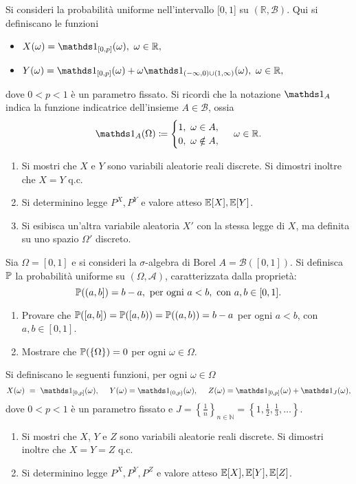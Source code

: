 Si consideri la probabilità uniforme nell'intervallo $[ 0,1$] su $(\mathbb{R} ,\mathcal{B})$. Qui si definiscano le funzioni
\begin{itemize}
\item $X( \omega ) =\Ind_{[ 0,p]}( \omega ) ,\ \omega \in \mathbb{R} ,$
\item $Y( \omega ) =\Ind_{[ 0,p]}( \omega ) +\omega \Ind_{( -\infty ,0) \cup ( 1,\infty )}( \omega ) ,\ \omega \in \mathbb{R} ,$
\end{itemize}

dove $0< p< 1$ è un parametro fissato. Si ricordi che la notazione $\Ind_{A}$ indica la funzione indicatrice dell'insieme $A\in \mathcal{B}$, ossia
\begin{equation*}
\Ind_{A}( \Omega ) \coloneqq \begin{cases}
1,\ \omega \in A,\\
0,\ \omega \notin A,
\end{cases}
\ \omega \in \mathbb{R} .
\end{equation*}
\begin{enumerate}
\item Si mostri che $X$ e $Y$ sono variabili aleatorie reali discrete. Si dimostri inoltre che $X=Y$ q.c.
\item Si determinino legge $P^{X} ,P^{Y}$ e valore atteso $\mathbb{E}[ X] ,\mathbb{E}[ Y]$.
\item Si esibisca un'altra variabile aleatoria $X' $ con la stessa legge di $X$, ma definita su uno spazio $\Omega ' $ discreto.
\end{enumerate}
\Esercizio{}

Sia $\Omega =[ 0,1]$ e si consideri la $\sigma $-algebra di Borel $A=\mathcal{B}([ 0,1])$. Si definisca $\mathbb{P}$ la probabilità uniforme su $( \Omega ,\mathcal{A})$, caratterizzata dalla proprietà:
\begin{equation*}
\mathbb{P}(( a,b]) =b-a,\ \text{per ogni} \ a< b,\ \text{con} \ a,b\in [ 0,1] .
\end{equation*}
\begin{enumerate}
\item Provare che $\mathbb{P}([ a,b]) =\mathbb{P}([ a,b)) =\mathbb{P}(( a,b)) =b-a$ per ogni $a< b$, con $a,b\in [ 0,1]$.
\item Mostrare che $\mathbb{P}(\{\Omega \}) =0$ per ogni $\omega \in \Omega $.
\end{enumerate}

Si definiscano le seguenti funzioni, per ogni $\omega \in \Omega $
\begin{equation*}
X( \omega ) \ =\ \Ind_{[ 0,p]}( \omega ) ,\ \ \ \ Y( \omega ) =\Ind_{( 0,p)}( \omega ) ,\ \ \ \ Z( \omega ) =\Ind_{[ 0,p]}( \omega ) +\Ind_{J}( \omega ) ,
\end{equation*}
dove $0< p< 1$ è un parametro fissato e $J=\left\{\frac{1}{n}\right\}_{n\in \mathbb{N}} =\left\{1,\frac{1}{2} ,\frac{1}{3} ,\dots \right\}$.
\begin{enumerate}
\item Si mostri che $X$, $Y$ e $Z$ sono variabili aleatorie reali discrete. Si dimostri inoltre che $X=Y=Z$ q.c.
\item Si determinino legge $P^{X} ,P^{Y} ,P^{Z}$ e valore atteso $\mathbb{E}[ X] ,\mathbb{E}[ Y] ,\mathbb{E}[ Z]$.
\end{enumerate}
\Esercizio{}

